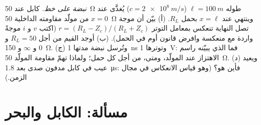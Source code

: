 \begin{exercise}[$\star\star\star$]\label{exo:b2:dispersion-wave-packets:12}
\emph{نبضة على خط.} كابل عند \qty{50}{\ohm} طوله $\ell = \qty{100}{m}$
($c = \qty{2e8}{m/s}$) يُغذَّى عند $x = 0$ من مولّد مقاومته
الداخلية \qty{50}{\ohm} وينتهي عند $x = \ell$ بحمل $R_L$. (أ) بيّن
أن موجة تصل النهاية تنعكس بمعامل التوتر
$r = (R_L - Z_c)/(R_L + Z_c)$ (اكتب $v$ و $i$ موجةً واردة
مع منعكسة وافرض قانون أوم في الحمل). (ب) أوجد القيم من أجل
$R_L = 50$ و $0$ و $\infty$ و \qty{150}{\ohm}. (ج) وتُرسل نبضة مدتها \qty{1}{ns} وتوترها \qty{1}{V}:
فما الذي يبيّنه راسم الاهتزاز عند المولّد، ومتى، من أجل كل
حمل؛ ولماذا تهمّ مقاومة المولّد \qty{50}{\ohm}. (د) ويعيد عيب في كابل
مدفون صدى بعد \qty{1.8}{\micro s}: فأين هو؟ (وهو قياس الانعكاس في
مجال الزمن.)
\end{exercise}

\section{مسألة: الكابل والبحر}

